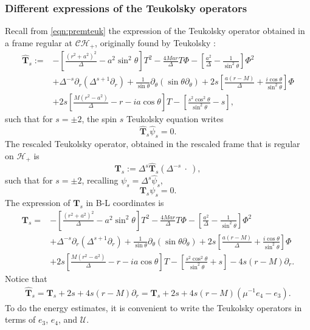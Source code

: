 \documentclass[reqno]{amsart}
\numberwithin{equation}{section}
\newcommand{\teukhat}{\widehat{\teuk}}
\newcommand{\mch}{\mathcal{H}}
\newcommand{\mcu}{\mathcal{U}}
\newcommand{\ch}{\mathcal{CH_+}}
\newcommand{\teuk}{\mathbf{T}}
\newcommand{\Psihat}{\widehat{\psi}}
\theoremstyle{plain}
\theoremstyle{definition}
\theoremstyle{remark}
\numberwithin{equation}{section}
\begin{document}
\subsubsection{Different expressions of the Teukolsky operators}\label{subsection:teukoperators}
Recall from \eqref{eqn:premteuk} the expression of the Teukolsky operator obtained in a frame regular at $\ch$, originally found by Teukolsky \cite{teukolsky} :
$$\begin{aligned}
\teukhat_s:= & -\left[\frac{\left(r^2+a^2\right)^2}{\Delta}-a^2 \sin ^2 \theta\right] T^2 -\frac{4 M a r}{\Delta} T \Phi -\left[\frac{a^2}{\Delta}-\frac{1}{\sin ^2 \theta}\right] \Phi^2  \\
& +\Delta^{-s} \partial_r\left(\Delta^{s+1} \partial_r \right)+\frac{1}{\sin \theta} \partial_\theta\left(\sin \theta \partial_\theta \right)+2 s\left[\frac{a(r-M)}{\Delta}+\frac{i \cos \theta}{\sin ^2 \theta}\right] \Phi  \\
& +2 s\left[\frac{M\left(r^2-a^2\right)}{\Delta}-r-i a \cos \theta\right] T -\left[\frac{s^2 \cos ^2 \theta}{\sin ^2 \theta}-s\right],
\end{aligned}$$
such that for $s=\pm 2$, the spin $s$ Teukolsky equation writes
$$\teukhat_s\Psihat_s=0.$$
The rescaled Teukolsky operator, obtained in the rescaled frame that is regular on $\mch_+$ is $$\teuk_s:=\Delta^s\teukhat_s(\Delta^{-s}\:\cdot\:),$$
such that for $s=\pm 2$, recalling $\psi_s=\Delta^s\Psihat_s$,
$$\teuk_s\psi_s=0.$$
The expression of $\teuk_s$ in B-L coordinates is 
$$\begin{aligned}
\teuk_s= & -\left[\frac{\left(r^2+a^2\right)^2}{\Delta}-a^2 \sin ^2 \theta\right] T^2 -\frac{4 M a r}{\Delta} T \Phi -\left[\frac{a^2}{\Delta}-\frac{1}{\sin ^2 \theta}\right] \Phi^2  \\
& +\Delta^{-s} \partial_r\left(\Delta^{s+1} \partial_r \right)+\frac{1}{\sin \theta} \partial_\theta\left(\sin \theta \partial_\theta \right)+2 s\left[\frac{a(r-M)}{\Delta}+\frac{i \cos \theta}{\sin ^2 \theta}\right] \Phi  \\
& +2 s\left[\frac{M\left(r^2-a^2\right)}{\Delta}-r-i a \cos \theta\right] T -\left[\frac{s^2 \cos ^2 \theta}{\sin ^2 \theta}+s\right] -4 s(r-M) \partial_r.
\end{aligned}$$
Notice that 
\begin{align}\label{eqn:dereqnn}
    \teukhat_s=\teuk_s+2s+4s(r-M)\partial_r=\teuk_s+2s+4s(r-M)(\mu^{-1}e_4-e_3).
\end{align}
To do the energy estimates, it is convenient to write the Teukolsky operators in terms of $e_3$, $e_4$, and $\mcu$.
\end{document}
